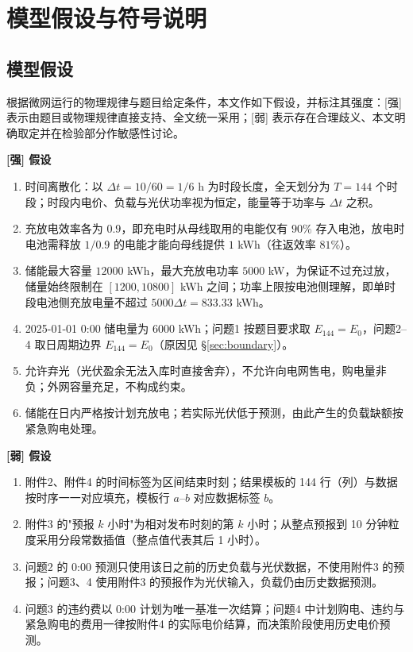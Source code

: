 \section{模型假设与符号说明}

\subsection{模型假设}

根据微网运行的物理规律与题目给定条件，本文作如下假设，并标注其强度：[强] 表示由题目或物理规律直接支持、全文统一采用；[弱] 表示存在合理歧义、本文明确取定并在检验部分作敏感性讨论。

\textbf{[强] 假设}

\begin{enumerate}[label=(\arabic*),leftmargin=2.2em,itemsep=2pt]
  \item 时间离散化：以 $\Delta t=10/60=1/6$ \si{h} 为时段长度，全天划分为 $T=144$ 个时段；时段内电价、负载与光伏功率视为恒定，能量等于功率与 $\Delta t$ 之积。
  \item 充放电效率各为 $0.9$，即充电时从母线取用的电能仅有 $90\%$ 存入电池，放电时电池需释放 $1/0.9$ 的电能才能向母线提供 $1$ \si{kWh}（往返效率 $81\%$）。
  \item 储能最大容量 $12000$ \si{kWh}，最大充放电功率 $5000$ \si{kW}，为保证不过充过放，储量始终限制在 $[1200,10800]$ \si{kWh} 之间；功率上限按电池侧理解，即单时段电池侧充放电量不超过 $5000\Delta t=833.33$ \si{kWh}。
  \item 2025-01-01 0:00 储电量为 $6000$ \si{kWh}；问题1 按题目要求取 $E_{144}=E_0$，问题2--4 取日周期边界 $E_{144}=E_0$（原因见 \S\ref{sec:boundary}）。
  \item 允许弃光（光伏盈余无法入库时直接舍弃），不允许向电网售电，购电量非负；外网容量充足，不构成约束。
  \item 储能在日内严格按计划充放电；若实际光伏低于预测，由此产生的负载缺额按紧急购电处理。
\end{enumerate}

\textbf{[弱] 假设}

\begin{enumerate}[label=(\arabic*),leftmargin=2.2em,itemsep=2pt,start=7]
  \item 附件2、附件4 的时间标签为区间结束时刻；结果模板的 144 行（列）与数据按时序一一对应填充，模板行 $a$--$b$ 对应数据标签 $b$。
  \item 附件3 的"预报 $k$ 小时"为相对发布时刻的第 $k$ 小时；从整点预报到 10 分钟粒度采用分段常数插值（整点值代表其后 1 小时）。
  \item 问题2 的 0:00 预测只使用该日之前的历史负载与光伏数据，不使用附件3 的预报；问题3、4 使用附件3 的预报作为光伏输入，负载仍由历史数据预测。
  \item 问题3 的违约费以 0:00 计划为唯一基准一次结算；问题4 中计划购电、违约与紧急购电的费用一律按附件4 的实际电价结算，而决策阶段使用历史电价预测。
\end{enumerate}

